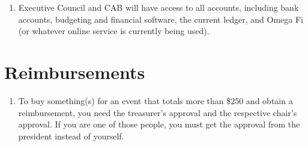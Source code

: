     \begin{enumerate}
    	\item Executive Council and CAB will have access to all accounts, including bank accounts, budgeting and financial software, the current ledger, and Omega Fi (or whatever online service is currently being used).
    \end{enumerate}
\section{Reimbursements}
	\begin{enumerate}
    	\item To buy something(s) for an event that totals more than \$250 and obtain a reimbursement, you need the treasurer’s approval and the respective chair’s approval. If you are one of those people, you must get the approval from the president instead of yourself.
    \end{enumerate}
